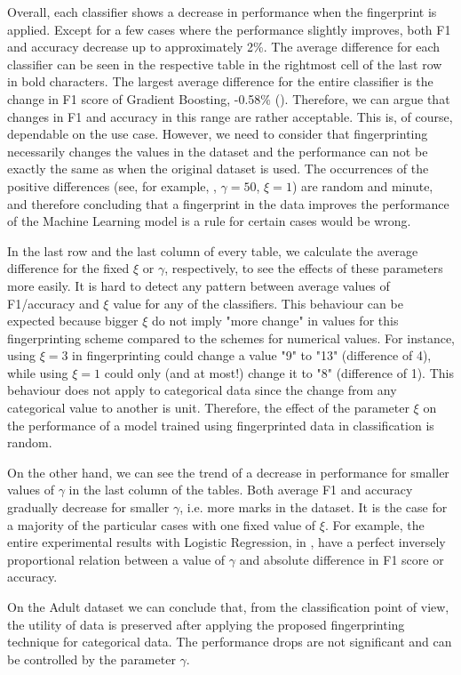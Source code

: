 Overall, each classifier shows a decrease in performance when the fingerprint is applied. 
Except for a few cases where the performance slightly improves, both F1 and accuracy decrease up to approximately 2\%. 
The average difference for each classifier can be seen in the respective table in the rightmost cell of the last row in bold characters. 
The largest average difference for the entire classifier is the change in F1 score of Gradient Boosting, -0.58\% (). Therefore, we can argue that changes in F1 and accuracy in this range are rather acceptable. This is, of course, dependable on the use case. However, we need to consider that fingerprinting necessarily changes the values in the dataset and the performance can not be exactly the same as when the original dataset is used. 
The occurrences of the positive differences (see, for example, , $\gamma=50$, $\xi=1$) are random and minute, and therefore concluding that a fingerprint in the data improves the performance of the Machine Learning model is a rule for certain cases would be wrong.

In the last row and the last column of every table, we calculate the average difference for the fixed $\xi$ or $\gamma$, respectively, to see the effects of these parameters more easily.
It is hard to detect any pattern between average values of F1/accuracy and $\xi$ value for any of the classifiers. 
This behaviour can be expected because bigger $\xi$ do not imply "more change" in values for this fingerprinting scheme compared to the schemes for numerical values.
For instance, using $\xi=3$ in fingerprinting could change a value "9" to "13" (difference of 4), while using $\xi=1$ could only (and at most!) change it to "8" (difference of 1). 
This behaviour does not apply to categorical data since the change from any categorical value to another is unit.
Therefore, the effect of the parameter $\xi$ on the performance of a model trained using fingerprinted data in classification is random. 

On the other hand, we can see the trend of a decrease in performance for smaller values of $\gamma$ in the last column of the tables. Both average F1 and accuracy gradually decrease for smaller $\gamma$, i.e. more marks in the dataset. It is the case for a majority of the particular cases with one fixed value of $\xi$. For example, the entire experimental results with Logistic Regression, in , have a perfect inversely proportional relation between a value of $\gamma$ and absolute difference in F1 score or accuracy.

On the Adult dataset we can conclude that, from the classification point of view, the utility of data is preserved after applying the proposed fingerprinting technique for categorical data. The performance drops are not significant and can be controlled by the parameter $\gamma$. 